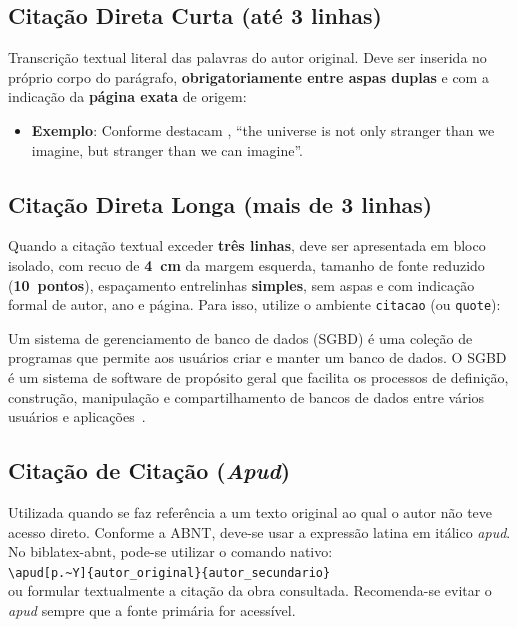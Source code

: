 \documentclass[ecp,tc,biblatex]{iiufrgs}
\begin{document}
\subsection{Citação Direta Curta (até 3 linhas)}
Transcrição textual literal das palavras do autor original. Deve ser inserida no próprio corpo do parágrafo, \textbf{obrigatoriamente entre aspas duplas} e com a indicação da \textbf{página exata} de origem:
\begin{itemize}
    \item \textbf{Exemplo}: Conforme destacam \textcite[p.~15]{Adams2009Conceptual}, ``\foreignlanguage{english}{the universe is not only stranger than we imagine, but stranger than we can imagine}''.
\end{itemize}

\subsection{Citação Direta Longa (mais de 3 linhas)}
Quando a citação textual exceder \textbf{três linhas}, deve ser apresentada em bloco isolado, com recuo de \textbf{4~cm} da margem esquerda, tamanho de fonte reduzido (\textbf{10~pontos}), espaçamento entrelinhas \textbf{simples}, sem aspas e com indicação formal de autor, ano e página. Para isso, utilize o ambiente \texttt{citacao} (ou \texttt{quote}):

\begin{citacao}
Um sistema de gerenciamento de banco de dados (SGBD) é uma coleção de programas que permite aos usuários criar e manter um banco de dados. O SGBD é um sistema de software de propósito geral que facilita os processos de definição, construção, manipulação e compartilhamento de bancos de dados entre vários usuários e aplicações~\cite[p.~4]{elmasri2005sistemas}.
\end{citacao}

\subsection{Citação de Citação (\textit{Apud})}
Utilizada quando se faz referência a um texto original ao qual o autor não teve acesso direto. Conforme a ABNT, deve-se usar a expressão latina em itálico \textit{apud}. No \textsf{biblatex-abnt}, pode-se utilizar o comando nativo:\\
\verb|\apud[p.~Y]{autor_original}{autor_secundario}|\\
ou formular textualmente a citação da obra consultada. Recomenda-se evitar o \textit{apud} sempre que a fonte primária for acessível.
\end{document}

